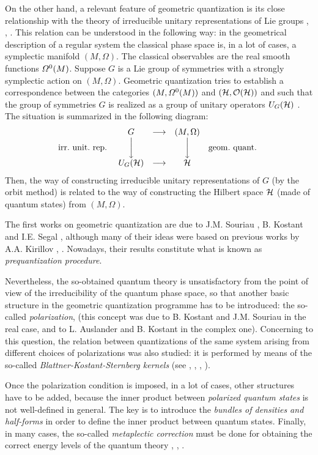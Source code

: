 \documentclass[12pt]{article}
\theoremstyle{plain}
\def\H{{\cal H}}
\begin{document}
On the other hand, a relevant feature
of geometric quantization is its close relationship
with the theory of irreducible unitary representations of Lie groups
\cite{AK-71}, \cite{Ki-62}, \cite{Ko-70}.
This relation can be understood in the following way:
in the geometrical description of a regular system
the classical phase space is, in a lot of cases, a symplectic manifold
$(M,\Omega )$. The classical observables are the real smooth
functions ${\mit\Omega}^0(M)$. Suppose $G$ is a Lie group of symmetries
with a strongly symplectic action on $(M,\Omega )$.
Geometric quantization tries to establish a correspondence between the
categories
$(M,{\mit\Omega}^0(M))$ and $(\H ,{\cal O}(\H ))$
and such that the group of symmetries $G$
is realized as a group of unitary operators $U_G(\H )$ \cite{Go-80}.
The situation is summarized in the following diagram:
$$
\begin{array}{ccccc}
& G & \longrightarrow & (M,\Omega ) &
\\
{\rm irr. \ unit. \ rep. \ } & \bigg\downarrow & &
\bigg\downarrow & {\rm geom. \ quant.\ }
\\
& U_G(\H ) & \longrightarrow & \H &
\end{array}
$$
Then, the way of constructing irreducible unitary representations
of $G$ (by the orbit method) is related to the way of constructing the
Hilbert space $\H$
(made of quantum states) from $(M,\Omega )$.

The first works on geometric quantization
are due to J.M. Souriau \cite{So-69}, B. Kostant \cite{Ko-70} and I.E.
Segal \cite{Se-60},
although many of their ideas were based on
previous works by A.A. Kirillov \cite{Ki-62}, \cite{Ki-76}.
Nowadays, their results constitute what is known as {\it prequantization
procedure}.

Nevertheless, the so-obtained quantum theory is unsatisfactory
 from the point of view of the irreducibility of the
quantum phase space, so that another basic structure
in the geometric quantization programme has to be introduced:
the so-called {\it polarization},
(this concept was due to B. Kostant and J.M. Souriau in the real case,
and to L. Auslander and B. Kostant in the complex one).
Concerning to this question, the relation between  quantizations of the
same
system arising from different choices of polarizations
was also studied: it is performed by means of the so-called
{\it Blattner-Kostant-Sternberg kernels}
(see \cite{Bl-73}, \cite{Bl-75}, \cite{Bl-77}, \cite{GS-77}).

Once the polarization condition is imposed,
in a lot of cases, other structures have to be added,
because  the inner product between {\it polarized quantum states}
is not well-defined in general.
The key is to introduce the {\it bundles of densities and half-forms}
\cite{Wn-77}
in order to define the inner product between quantum states.
Finally, in many cases, the so-called {\it metaplectic correction} must
be done
for obtaining the correct energy levels of the quantum theory
\cite{Bl-73}, \cite{GS-77}, \cite{Ko-74}.
\end{document}

